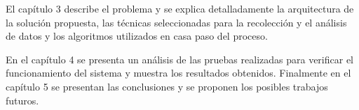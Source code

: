 El capítulo 3  describe el problema y se explica detalladamente la arquitectura de la solución propuesta, las técnicas seleccionadas para la recolección y el análisis de datos y los algoritmos utilizados en casa paso del proceso.

En el capítulo 4 se presenta un análisis de las pruebas realizadas para verificar el funcionamiento del sistema y muestra los resultados obtenidos. Finalmente en el capítulo 5 se presentan las conclusiones y se proponen los posibles trabajos futuros.

